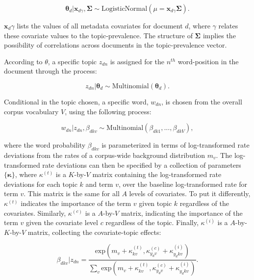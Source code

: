 \documentclass[12pt,a4paper,notitlepage]{article}
\begin{document}
\begin{equation}
	\boldsymbol{\theta}_d|\boldsymbol{x}_{d\gamma},\boldsymbol{\Sigma} \sim \textrm{LogisticNormal}(\mu = \boldsymbol{x}_{d\gamma}\boldsymbol{\Sigma}).
\end{equation}

$\boldsymbol{x}_d\gamma$ lists the values of all metadata covariates for document $d$, where $\gamma$ relates these covariate values to the topic-prevalence. The structure of $\boldsymbol{\Sigma}$ implies the possibility of correlations across documents in the topic-prevalence vector. 

According to $\theta$, a specific topic $z_{dn}$ is assigned for the $n^{th}$ word-position in the document through the process:

\begin{equation}
	z_{dn}|\boldsymbol{\theta}_d \sim \textrm{Multinomial}(\boldsymbol{\theta}_d).
\end{equation}

Conditional in the topic chosen, a specific word, $w_{dn}$, is chosen from the overall corpus vocabulary $V$, using the following process:

\begin{equation}
	w_{dn}|z_{dn},\beta_{dkv} \sim \textrm{Multinomial}(\beta_{dk1},...,\beta_{dkV}),
\end{equation}

where the word probability $\beta_{dkv}$ is parameterized in terms of log-transformed rate deviations from the rates of a corpus-wide background distribution $m_v$. The log-transformed rate deviations can then be specified by a collection of parameters $\lbrace \boldsymbol{\kappa} \rbrace$, where $\kappa^{(t)}$ is a $K$-by-$V$ matrix containing the log-transformed rate deviations for each topic $k$ and term $v$, over the baseline log-transformed rate for term $v$. This matrix is the same for all $A$ levels of covariates. To put it differently, $\kappa^{(t)}$ indicates the importance of the term $v$ given topic $k$ regardless of the covariates. Similarly, $\kappa^{(c)}$ is a $A$-by-$V$ matrix, indicating the importance of the term $v$ given the covariate level $c$ regardless of the topic. Finally, $\kappa^{(i)}$ is a $A$-by-$K$-by-$V$ matrix, collecting the covariate-topic effects:

\begin{equation}
	\beta_{dkv}|z_{dn}=\frac{\textrm{exp}(m_v+\kappa^{(t)}_{kv},\kappa^{(c)}_{y_dv}+\kappa^{(i)}_{y_dkv})}{\sum_v \textrm{exp}(m_v+\kappa^{(t)}_{kv},\kappa^{(c)}_{y_dv}+\kappa^{(i)}_{y_dkv})}.
\end{equation}
\end{document}

